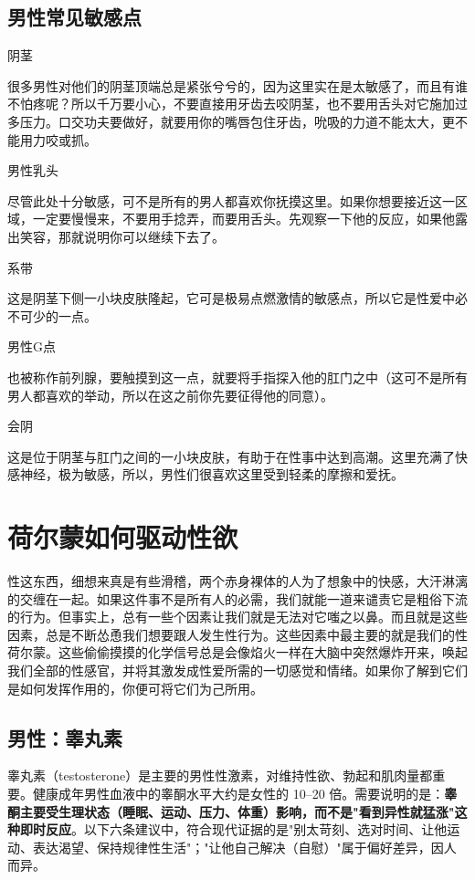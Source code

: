\documentclass[12pt,UTF8,openany]{ctexbook}
\begin{document}
\subsection*{男性常见敏感点}

阴茎

很多男性对他们的阴茎顶端总是紧张兮兮的，因为这里实在是太敏感了，而且有谁不怕疼呢？所以千万要小心，不要直接用牙齿去咬阴茎，也不要用舌头对它施加过多压力。口交功夫要做好，就要用你的嘴唇包住牙齿，吮吸的力道不能太大，更不能用力咬或抓。

男性乳头

尽管此处十分敏感，可不是所有的男人都喜欢你抚摸这里。如果你想要接近这一区域，一定要慢慢来，不要用手捻弄，而要用舌头。先观察一下他的反应，如果他露出笑容，那就说明你可以继续下去了。

系带

这是阴茎下侧一小块皮肤隆起，它可是极易点燃激情的敏感点，所以它是性爱中必不可少的一点。

男性G点

也被称作前列腺，要触摸到这一点，就要将手指探入他的肛门之中（这可不是所有男人都喜欢的举动，所以在这之前你先要征得他的同意）。

会阴

这是位于阴茎与肛门之间的一小块皮肤，有助于在性事中达到高潮。这里充满了快感神经，极为敏感，所以，男性们很喜欢这里受到轻柔的摩擦和爱抚。

\section{荷尔蒙如何驱动性欲}

性这东西，细想来真是有些滑稽，两个赤身裸体的人为了想象中的快感，大汗淋漓的交缠在一起。如果这件事不是所有人的必需，我们就能一道来谴责它是粗俗下流的行为。但事实上，总有一些个因素让我们就是无法对它嗤之以鼻。而且就是这些因素，总是不断怂恿我们想要跟人发生性行为。这些因素中最主要的就是我们的性荷尔蒙。这些偷偷摸摸的化学信号总是会像焰火一样在大脑中突然爆炸开来，唤起我们全部的性感官，并将其激发成性爱所需的一切感觉和情绪。如果你了解到它们是如何发挥作用的，你便可将它们为己所用。
\subsection*{男性：睾丸素}
睾丸素（testosterone）是主要的男性性激素，对维持性欲、勃起和肌肉量都重要。健康成年男性血液中的睾酮水平大约是女性的 10–20 倍。需要说明的是：\textbf{睾酮主要受生理状态（睡眠、运动、压力、体重）影响，而不是"看到异性就猛涨"这种即时反应}。以下六条建议中，符合现代证据的是"别太苛刻、选对时间、让他运动、表达渴望、保持规律性生活"；"让他自己解决（自慰）"属于偏好差异，因人而异。
\end{document}
